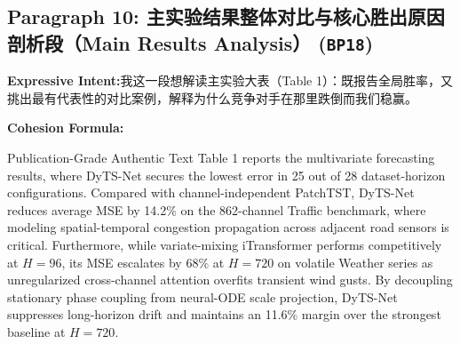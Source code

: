 \subsection*{Paragraph 10: 主实验结果整体对比与核心胜出原因剖析段（Main Results Analysis） (\texttt{BP18})}
\noindent\textbf{Expressive Intent:}\enspace 我这一段想解读主实验大表（Table 1）：既报告全局胜率，又挑出最有代表性的对比案例，解释为什么竞争对手在那里跌倒而我们稳赢。\par
\noindent\textbf{Cohesion Formula:}\par\vspace{4pt}
\begin{ExampleBox}{Publication-Grade Authentic Text}
Table 1 reports the multivariate forecasting results, where DyTS-Net secures the lowest error in 25 out of 28 dataset-horizon configurations. Compared with channel-independent PatchTST, DyTS-Net reduces average MSE by 14.2\% on the 862-channel Traffic benchmark, where modeling spatial-temporal congestion propagation across adjacent road sensors is critical. Furthermore, while variate-mixing iTransformer performs competitively at $H=96$, its MSE escalates by 68\% at $H=720$ on volatile Weather series as unregularized cross-channel attention overfits transient wind gusts. By decoupling stationary phase coupling from neural-ODE scale projection, DyTS-Net suppresses long-horizon drift and maintains an 11.6\% margin over the strongest baseline at $H=720$.
\end{ExampleBox}
